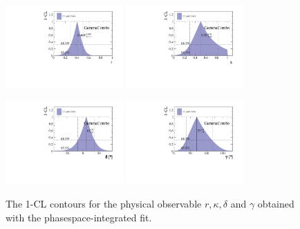 \begin{figure}[h]
	\centering
		\includegraphics[width=0.4\textwidth, height = !]{figs/GammaCombo/signal_toy/cartesian_cp_coeff_r.pdf} 
		\includegraphics[width=0.4\textwidth, height = !]{figs/GammaCombo/signal_toy/cartesian_cp_coeff_k.pdf} 
		
		\includegraphics[width=0.4\textwidth, height = !]{figs/GammaCombo/signal_toy/cartesian_cp_coeff_d.pdf} 
		\includegraphics[width=0.4\textwidth, height = !]{figs/GammaCombo/signal_toy/cartesian_cp_coeff_g.pdf} 
		\caption{The 1-CL contours for the physical observable $r,\kappa,\delta$ and $\gamma$ obtained with the phasespace-integrated fit. }
		\label{fig:FitCL}	
\end{figure} 

